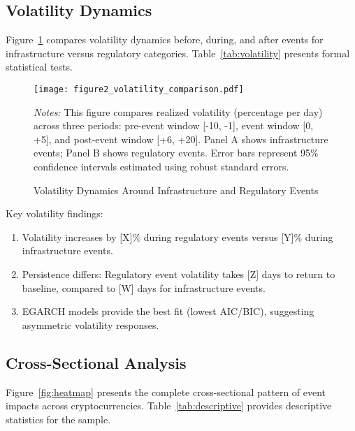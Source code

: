 \documentclass[12pt]{article}
\begin{document}
\subsection{Volatility Dynamics}

Figure~\ref{fig:volatility} compares volatility dynamics before, during, and after events for infrastructure versus regulatory categories. Table~\ref{tab:volatility} presents formal statistical tests.

\begin{figure}[htbp]
    \centering
    \texttt{[image: figure2\_volatility\_comparison.pdf]}
    \caption{Volatility Dynamics Around Infrastructure and Regulatory Events}
    \label{fig:volatility}
    \begin{minipage}{\textwidth}
        \small
        \textit{Notes:} This figure compares realized volatility (percentage per day) across three periods: pre-event window [-10, -1], event window [0, +5], and post-event window [+6, +20]. Panel A shows infrastructure events; Panel B shows regulatory events. Error bars represent 95\% confidence intervals estimated using robust standard errors.
    \end{minipage}
\end{figure}



Key volatility findings:

\begin{enumerate}
    \item Volatility increases by [X]\% during regulatory events versus [Y]\% during infrastructure events.

    \item Persistence differs: Regulatory event volatility takes [Z] days to return to baseline, compared to [W] days for infrastructure events.

    \item EGARCH models provide the best fit (lowest AIC/BIC), suggesting asymmetric volatility responses.
\end{enumerate}

\subsection{Cross-Sectional Analysis}

Figure~\ref{fig:heatmap} presents the complete cross-sectional pattern of event impacts across cryptocurrencies. Table~\ref{tab:descriptive} provides descriptive statistics for the sample.
\end{document}
